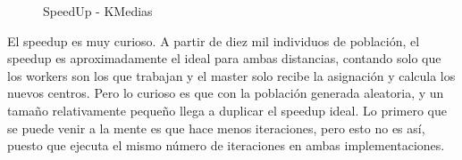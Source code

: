 \begin{figure}[!h]
	\centering
	\caption{SpeedUp - KMedias}
\end{figure}

El speedup es muy curioso. A partir de diez mil individuos de población, el speedup es aproximadamente el ideal para ambas distancias, contando solo que los workers son los que trabajan y el master solo recibe la asignación y calcula los nuevos centros. Pero lo curioso es que con la población generada aleatoria, y un tamaño relativamente pequeño llega a duplicar el speedup ideal. Lo primero que se puede venir a la mente es que hace menos iteraciones, pero esto no es así, puesto que ejecuta el mismo número de iteraciones en ambas implementaciones. 




